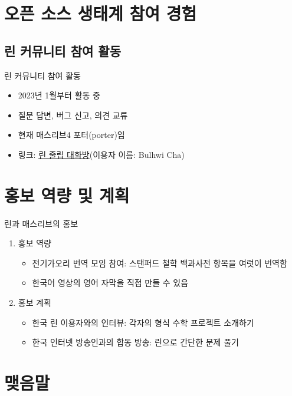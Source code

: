 \documentclass{beamer}
\begin{document}
\section{오픈 소스 생태계 참여 경험}

\subsection{린 커뮤니티 참여 활동}

\begin{frame}{린 커뮤니티 참여 활동}
  \begin{itemize}
    \item 2023년 1월부터 활동 중
    \item 질문 답변, 버그 신고, 의견 교류
    \item 현재 매스리브4 포터(porter)임
    \item 링크: \href{https://leanprover.zulipchat.com}{린 줄립 대화방}(이용자 이름:
          Bulhwi Cha)
  \end{itemize}
\end{frame}

\section{홍보 역량 및 계획}

\begin{frame}{린과 매스리브의 홍보}
  \begin{enumerate}
    \item 홍보 역량
      \begin{itemize}
        \item 전기가오리 번역 모임 참여: 스탠퍼드 철학 백과사전 항목을 여럿이 번역함
        \item 한국어 영상의 영어 자막을 직접 만들 수 있음
      \end{itemize}
    \item 홍보 계획
      \begin{itemize}
        \item 한국 린 이용자와의 인터뷰: 각자의 형식 수학 프로젝트 소개하기
        \item 한국 인터넷 방송인과의 합동 방송: 린으로 간단한 문제 풀기
      \end{itemize}
  \end{enumerate}
\end{frame}

\section{맺음말}
\end{document}
